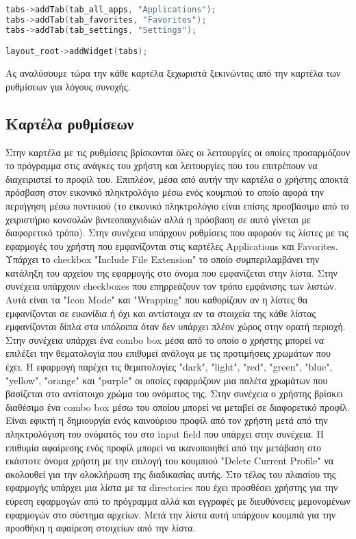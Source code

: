 \begin{lstlisting}[language=C++, style=cppstyle]
tabs->addTab(tab_all_apps, "Applications");
tabs->addTab(tab_favorites, "Favorites");
tabs->addTab(tab_settings, "Settings");

layout_root->addWidget(tabs);
\end{lstlisting}

Ας αναλύσουμε τώρα την κάθε καρτέλα ξεχωριστά ξεκινώντας από την καρτέλα των ρυθμίσεων για
λόγους συνοχής.



\subsection{Καρτέλα ρυθμίσεων}

Στην καρτέλα με τις ρυθμίσεις βρίσκονται όλες οι λειτουργίες οι οποίες προσαρμόζουν το
πρόγραμμα στις ανάγκες του χρήστη και λειτουργίες που του επιτρέπουν να διαχειριστεί το
προφίλ του. Επιπλέον, μέσα από αυτήν την καρτέλα ο χρήστης αποκτά πρόσβαση στον εικονικό
πληκτρολόγιο μέσω ενός κουμπιού το οποίο αφορά την περιήγηση μέσω ποντικιού (το εικονικό
πληκτρολόγιο είναι επίσης προσβάσιμο από το χειριστήριο κονσολών βιντεοπαιχνιδιών αλλά η
πρόσβαση σε αυτό γίνεται με διαφορετικό τρόπο). Στην συνέχεια υπάρχουν ρυθμίσεις που αφορούν
τις λίστες με τις εφαρμογές του χρήστη που εμφανίζονται στις καρτέλες Applications και 
Favorites. Υπάρχει το checkbox "Include File Extension" το οποίο συμπεριλαμβάνει την κατάληξη
του αρχείου της εφαρμογής στο όνομα που εμφανίζεται στην λίστα. Στην συνέχεια υπάρχουν
checkboxes που επηρρεάζουν τον τρόπο εμφάνισης των λιστών. Αυτά είναι τα "Icon Mode" και
"Wrapping" που καθορίζουν αν η λίστες θα εμφανίζονται σε εικονίδια ή όχι και αντίστοιχα αν τα στοιχεία
της κάθε λίστας εμφανίζονται δίπλα στα υπόλοιπα όταν δεν υπάρχει πλέον χώρος στην ορατή περιοχή.
Στην συνέχεια υπάρχει ένα combo box μέσα από το οποίο ο χρήστης μπορεί να επιλέξει την
θεματολογία που επιθυμεί ανάλογα με τις προτιμήσεις χρωμάτων που έχει. Η εφαρμογή παρέχει τις
θεματολογίες "dark", "light", "red", "green", "blue", "yellow", "orange" και "purple" οι οποίες
εφαρμόζουν μια παλέτα χρωμάτων που βασίζεται στο αντίστοιχο χρώμα του ονόματος της. Στην συνέχεια
ο χρήστης βρίσκει διαθέσιμο ένα combo box μέσω του οποίου μπορεί να μεταβεί σε διαφορετικό προφίλ.
Είναι εφικτή η δημιουργία ενός καινούριου προφίλ από τον χρήστη μετά από την πληκτρολόγιση του
ονόματός του στο input field που υπάρχει στην συνέχεια. Η επιθυμία αφαίρεσης ενός προφίλ μπορεί να
ικανοποιηθεί από την μετάβαση στο εκάστοτε όνομα χρήστη με την επιλογή του κουμπιού
"Delete Current Profile" να ακολουθεί για την ολοκλήρωση της διαδικασίας αυτής. Στο τέλος του πλαισίου
της εφαρμογής υπάρχει μια λίστα με τα directories που έχει προσθέσει χρήστης για την εύρεση εφαρμογών 
από το πρόγραμμα αλλά και εγγραφές με διευθύνσεις μεμονομένων εφαρμογών στο σύστημα αρχείων.
Μετά την λίστα αυτή υπάρχουν κουμπιά για την προσθήκη η αφαίρεση στοιχείων από την λίστα.



